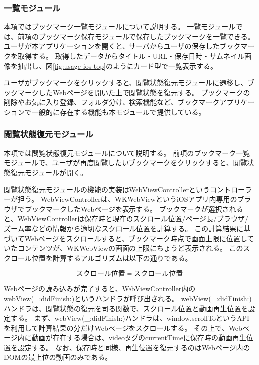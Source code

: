 \subsubsection{一覧モジュール}
本項ではブックマーク一覧モジュールについて説明する。
一覧モジュールでは、前項のブックマーク保存モジュールで保存したブックマークを一覧できる。
ユーザが本アプリケーションを開くと、サーバからユーザの保存したブックマークを取得する。
取得したデータからタイトル・URL・保存日時・サムネイル画像を抽出し、図\ref{fig:usage-ios-top}のようにカード型で一覧表示する。

ユーザがブックマークをクリックすると、閲覧状態復元モジュールに遷移し、ブックマークしたWebページを開いた上で閲覧状態を復元する。
ブックマークの削除やお気に入り登録、フォルダ分け、検索機能など、ブックマークアプリケーションで一般的に存在する機能も本モジュールで提供している。

\subsubsection{閲覧状態復元モジュール}
\label{sec:impl-client-ios-restore-module}

本項では閲覧状態復元モジュールについて説明する。
前項のブックマーク一覧モジュールで、ユーザが再度閲覧したいブックマークをクリックすると、閲覧状態復元モジュールが開く。

閲覧状態復元モジュールの機能の実装はWebViewControllerというコントローラーが担う。
WebViewControllerは、WKWebViewというiOSアプリ内専用のブラウザでブックマークしたWebページを表示する。
ブックマークが選択されると、WebViewControllerは保存時と現在のスクロール位置/ページ長/ブラウザ/ズーム率などの情報から適切なスクロール位置を計算する。
この計算結果に基づいてWebページをスクロールすると、ブックマーク時点で画面上限に位置していたコンテンツが、WKWebViewの画面の上限にちょうど表示される。
このスクロール位置を計算するアルゴリズムは以下の通りである。

\begin{equation}
スクロール位置 = スクロール位置
\end{equation}

Webページの読み込みが完了すると、WebViewController内のwebView(\_:didFinish:)\cite{didFinish}というハンドラが呼び出される。
webView(\_:didFinish:)ハンドラは、閲覧状態の復元を司る関数で、スクロール位置と動画再生位置を設定する。
まず、webView(\_:didFinish:)ハンドラは、window.scrollToというAPIを利用して計算結果の分だけWebページをスクロールする。
その上で、Webページ内に動画が存在する場合は、videoタグのcurrentTimeに保存時の動画再生位置を設定する。
なお、保存時と同様、再生位置を復元するのはWebページ内のDOMの最上位の動画のみである。

